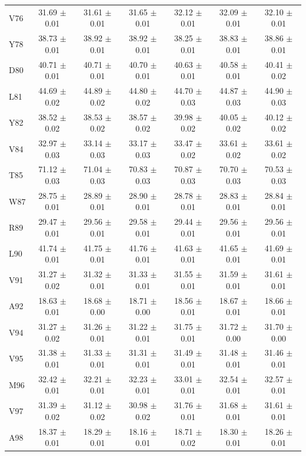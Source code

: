 \documentclass[%
 aip,
 amsmath,amssymb,
 preprint,%
]{revtex4-1}
\begin{document}
\begin{center}
\begin{longtable}{l|c|c|c|c|c|c}
V76 & 31.69 $\pm$ 0.01 & 31.61 $\pm$ 0.01 & 31.65 $\pm$ 0.01 & 32.12 $\pm$ 0.01 & 32.09 $\pm$ 0.01 & 32.10 $\pm$ 0.01 \\
Y78 & 38.73 $\pm$ 0.01 & 38.92 $\pm$ 0.01 & 38.92 $\pm$ 0.01 & 38.25 $\pm$ 0.01 & 38.83 $\pm$ 0.01 & 38.86 $\pm$ 0.01 \\
D80 & 40.71 $\pm$ 0.01 & 40.71 $\pm$ 0.01 & 40.70 $\pm$ 0.01 & 40.63 $\pm$ 0.01 & 40.58 $\pm$ 0.01 & 40.41 $\pm$ 0.02 \\
L81 & 44.69 $\pm$ 0.02 & 44.89 $\pm$ 0.02 & 44.80 $\pm$ 0.02 & 44.70 $\pm$ 0.03 & 44.87 $\pm$ 0.03 & 44.90 $\pm$ 0.03 \\
Y82 & 38.52 $\pm$ 0.02 & 38.53 $\pm$ 0.02 & 38.57 $\pm$ 0.02 & 39.98 $\pm$ 0.02 & 40.05 $\pm$ 0.02 & 40.12 $\pm$ 0.02 \\
V84 & 32.97 $\pm$ 0.03 & 33.14 $\pm$ 0.03 & 33.17 $\pm$ 0.03 & 33.47 $\pm$ 0.02 & 33.61 $\pm$ 0.02 & 33.61 $\pm$ 0.02 \\
T85 & 71.12 $\pm$ 0.03 & 71.04 $\pm$ 0.03 & 70.83 $\pm$ 0.03 & 70.87 $\pm$ 0.03 & 70.70 $\pm$ 0.03 & 70.53 $\pm$ 0.03 \\
W87 & 28.75 $\pm$ 0.01 & 28.89 $\pm$ 0.01 & 28.90 $\pm$ 0.01 & 28.78 $\pm$ 0.01 & 28.83 $\pm$ 0.01 & 28.84 $\pm$ 0.01 \\
R89 & 29.47 $\pm$ 0.01 & 29.56 $\pm$ 0.01 & 29.58 $\pm$ 0.01 & 29.44 $\pm$ 0.01 & 29.56 $\pm$ 0.01 & 29.56 $\pm$ 0.01 \\
L90 & 41.74 $\pm$ 0.01 & 41.75 $\pm$ 0.01 & 41.76 $\pm$ 0.01 & 41.63 $\pm$ 0.01 & 41.65 $\pm$ 0.01 & 41.69 $\pm$ 0.01 \\
V91 & 31.27 $\pm$ 0.02 & 31.32 $\pm$ 0.01 & 31.33 $\pm$ 0.01 & 31.55 $\pm$ 0.01 & 31.59 $\pm$ 0.01 & 31.61 $\pm$ 0.01 \\
A92 & 18.63 $\pm$ 0.01 & 18.68 $\pm$ 0.00 & 18.71 $\pm$ 0.00 & 18.56 $\pm$ 0.01 & 18.67 $\pm$ 0.01 & 18.66 $\pm$ 0.01 \\
V94 & 31.27 $\pm$ 0.02 & 31.26 $\pm$ 0.01 & 31.22 $\pm$ 0.01 & 31.75 $\pm$ 0.01 & 31.72 $\pm$ 0.00 & 31.70 $\pm$ 0.00 \\
V95 & 31.38 $\pm$ 0.01 & 31.33 $\pm$ 0.01 & 31.31 $\pm$ 0.01 & 31.49 $\pm$ 0.01 & 31.48 $\pm$ 0.01 & 31.46 $\pm$ 0.01 \\
M96 & 32.42 $\pm$ 0.01 & 32.21 $\pm$ 0.01 & 32.23 $\pm$ 0.01 & 33.01 $\pm$ 0.01 & 32.54 $\pm$ 0.01 & 32.57 $\pm$ 0.01 \\
V97 & 31.39 $\pm$ 0.02 & 31.12 $\pm$ 0.02 & 30.98 $\pm$ 0.02 & 31.76 $\pm$ 0.01 & 31.68 $\pm$ 0.01 & 31.61 $\pm$ 0.01 \\
A98 & 18.37 $\pm$ 0.01 & 18.29 $\pm$ 0.01 & 18.16 $\pm$ 0.01 & 18.71 $\pm$ 0.02 & 18.30 $\pm$ 0.01 & 18.26 $\pm$ 0.01 \\

\end{longtable}
\end{center}
\end{document}
